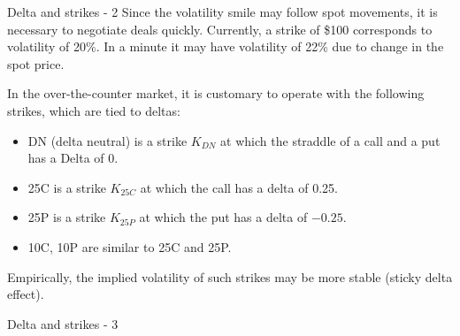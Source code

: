 \documentclass{beamer}
\begin{document}
\begin{frame}{Delta and strikes - 2}
\justify
Since the volatility smile may follow spot movements, it is necessary to negotiate deals quickly. Currently, a strike of \$100 corresponds to volatility of 20\%. In a minute it may have volatility of 22\% due to change in the spot price.

\justify
In the over-the-counter market, it is customary to operate with the following strikes, which are tied to deltas:
\begin{itemize}
\item DN (delta neutral) is a strike $K_{DN}$ at which the straddle of a call and a put has a Delta of 0.
\item 25C is a strike $K_{25C}$ at which the call has a delta of 0.25.
\item 25P is a strike $K_{25P}$ at which the put has a delta of $-0.25$.
\item 10C, 10P are similar to 25C and 25P.
\end{itemize}

\justify
Empirically, the implied volatility of such strikes may be more stable (sticky delta effect).
\end{frame}



\newcommand{\drawVolNode}[4] {

	\node[
		circle,
		color=Set1-B,
		fill,
		inner sep=2pt
	] at (#1, #2) {};
	
	\node[anchor=#4] at (#1, #2) {$\sigma_{#3}$};
}

\begin{frame}{Delta and strikes - 3}
\centering
{}
\end{frame}
\end{document}
